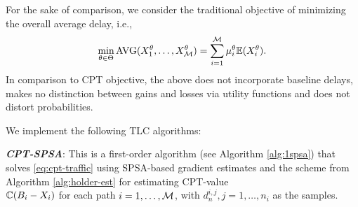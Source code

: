 For the sake of comparison, we consider the traditional objective of minimizing the overall average delay, i.e.,
\begin{align}
\min_{\theta\in \Theta}\text{AVG}(X_1^\theta,\ldots,X_{\mathcal{M}}^\theta) = \sum_{i=1}^{\mathcal{M}} \mu_i^\theta \mathbb{E}(X_i^\theta). \label{eq:avg-traffic} 
\end{align}
In comparison to CPT objective, the above does not incorporate baseline delays, makes no distinction between gains and losses via utility functions and does not distort probabilities. 
% 
% 
% 

We implement the following TLC algorithms:

{\bf\em CPT-SPSA}: This is a first-order algorithm (see Algorithm \ref{alg:1spsa}) that solves \eqref{eq:cpt-traffic} using SPSA-based gradient estimates and the scheme from Algorithm \ref{alg:holder-est} for estimating CPT-value \\$\mathbb{C}(B_i-X_i)$ for each path $i=1,\ldots,\mathcal{M}$, with $d_n^{i,j}, j=1,\ldots,n_i$ as the samples.


